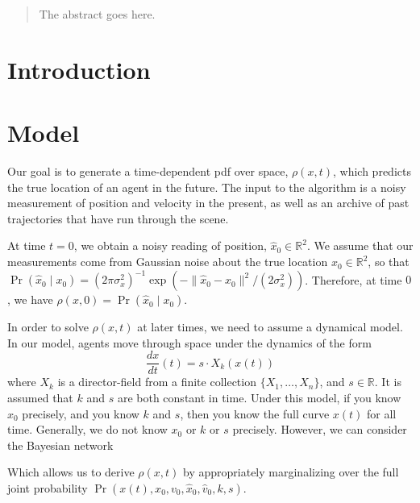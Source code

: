 \documentclass[conference]{IEEEtran}
\begin{document}
\begin{abstract}
The abstract goes here.
\end{abstract}

\IEEEpeerreviewmaketitle

\section{Introduction}

\section{Model}
Our goal is to generate a time-dependent pdf over space, $\rho(x,t)$, which predicts the true location of an agent in the future.
The input to the algorithm is a noisy measurement of position and velocity in the present, as well as an archive of past trajectories that have run through the scene.

At time $t=0$, we obtain a noisy reading of position, $\hat{x}_0 \in \mathbb{R}^2$.
We assume that our measurements come from Gaussian noise about the true location $x_0 \in \mathbb{R}^2$,
so that $\Pr(\hat{x}_0 \mid x_0 ) = (2\pi \sigma_x^2)^{-1} \exp( - \| \hat{x}_0 - x_0 \|^2 / (2 \sigma_x^2) )$.
Therefore, at time $0$, we have $\rho(x,0) = \Pr(\hat{x}_0 \mid x_0 )$.

In order to solve $\rho(x,t)$ at later times, we need to assume a dynamical model.
In our model, agents move through space under the dynamics of the form
$$
	\frac{dx}{dt}(t) = s \cdot X_k(x(t))
$$
where $X_k$ is a director-field from a finite collection $\{X_1, \dots, X_n\}$, and $s \in \mathbb{R}$.
It is assumed that $k$ and $s$ are both constant in time.
Under this model, if you know $x_0$ precisely, and you know $k$ and $s$, then you know the full curve $x(t)$ for all time.
Generally, we do not know $x_0$ or $k$ or $s$ precisely.
However, we can consider the Bayesian network
\begin{center}
\end{center}
Which allows us to derive $\rho(x,t)$ by appropriately marginalizing over the full joint probability $\Pr(x(t), x_0, v_0, \hat{x}_0, \hat{v}_0, k, s)$.
\end{document}
